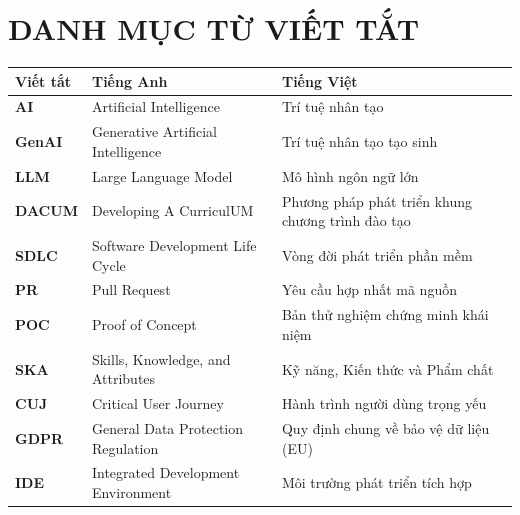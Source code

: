 \section*{DANH MỤC TỪ VIẾT TẮT}

\begin{table}[h!]
\renewcommand{\arraystretch}{1.3}
\begin{tabular}{@{}p{2.5cm} p{7cm} p{6cm}@{}}
\textbf{Viết tắt} & \textbf{Tiếng Anh} & \textbf{Tiếng Việt} \\ \hline
\textbf{AI} & Artificial Intelligence & Trí tuệ nhân tạo \\
\textbf{GenAI} & Generative Artificial Intelligence & Trí tuệ nhân tạo tạo sinh \\
\textbf{LLM} & Large Language Model & Mô hình ngôn ngữ lớn \\
\textbf{DACUM} & Developing A CurriculUM & Phương pháp phát triển khung chương trình đào tạo \\
\textbf{SDLC} & Software Development Life Cycle & Vòng đời phát triển phần mềm \\
\textbf{PR} & Pull Request & Yêu cầu hợp nhất mã nguồn \\
\textbf{POC} & Proof of Concept & Bản thử nghiệm chứng minh khái niệm \\
\textbf{SKA} & Skills, Knowledge, and Attributes & Kỹ năng, Kiến thức và Phẩm chất \\
\textbf{CUJ} & Critical User Journey & Hành trình người dùng trọng yếu \\
\textbf{GDPR} & General Data Protection Regulation & Quy định chung về bảo vệ dữ liệu (EU) \\
\textbf{IDE} & Integrated Development Environment & Môi trường phát triển tích hợp \\ \hline
\end{tabular}
\end{table}